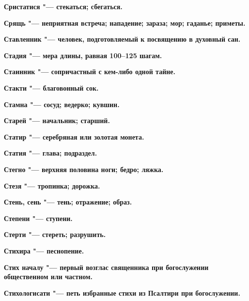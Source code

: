 \begin{multicols}{2}
\bfseries Сристатися\normalfont{} "--- стекаться; сбегаться. 




\bfseries Срящь\normalfont{} "--- неприятная встреча; нападение; зараза; мор; гаданье; приметы. 




\bfseries Ставленник\normalfont{} "--- человек, подготовляемый к посвящению в духовный сан. 




\bfseries Стадия\normalfont{} "--- мера длины, равная 100--125 шагам. 




\bfseries Стаинник\normalfont{} "--- сопричастный с кем-либо одной тайне. 




\bfseries Стакти\normalfont{} "--- благовонный сок. 




\bfseries Стамна\normalfont{} "--- сосуд; ведерко; кувшин. 




\bfseries Старей\normalfont{} "--- начальник; старший. 




\bfseries Статир\normalfont{} "--- серебряная или золотая монета. 




\bfseries Статия\normalfont{} "--- глава; подраздел. 




\bfseries Стегно\normalfont{} "--- верхняя половина ноги; бедро; ляжка. 




\bfseries Стезя\normalfont{} "--- тропинка; дорожка. 




\bfseries Стень, сень\normalfont{} "--- тень; отражение; образ. 




\bfseries Степени\normalfont{} "--- ступени. 




\bfseries Стерти\normalfont{} "--- стереть; разрушить. 




\bfseries Стихира\normalfont{} "--- песнопение. 




\bfseries Стих началу\normalfont{} "--- первый возглас священника при богослужении общественном или частном. 




\bfseries Стихологисати\normalfont{} "--- петь избранные стихи из Псалтири при богослужении. 





\end{multicols}
